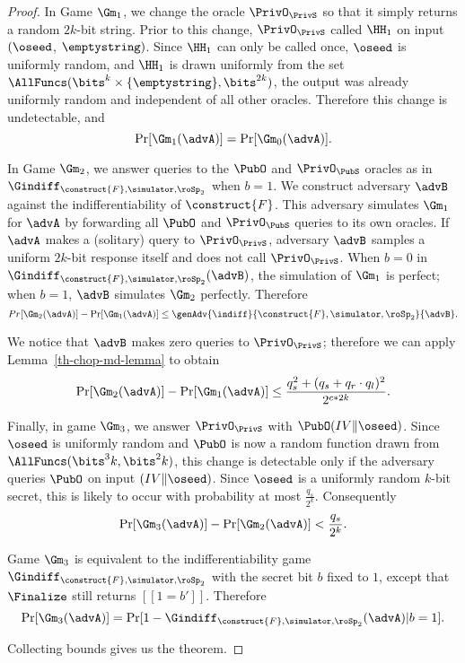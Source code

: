 \begin{proof}
	In Game $\Gm_1$, we change the oracle $\PrivO_{\PrivS}$ so that it simply returns a random $2k$-bit string. Prior to this change, $\PrivO_{\PrivS}$ called $\HH_1$ on input $(\oseed$, $\emptystring)$. Since $\HH_1$ can only be called once, $\oseed$ is uniformly random, and $\HH_1$ is drawn uniformly from the set $\AllFuncs(\bits^k \times \{\emptystring\}, \bits^{2k})$, the output was already uniformly random and independent of all other oracles. Therefore this change is undetectable, and 
	\[\Pr[\Gm_1(\advA)] = \Pr[\Gm_0(\advA)].\] 
	
	In Game $\Gm_2$, we answer queries to the $\PubO$ and $\PrivO_{\PubS}$ oracles as in $\Gindiff_{\construct{F}, \simulator, \roSp_2}$ when $b = 1$. We construct adversary $\advB$ against the indifferentiability of $\construct{F}$. This adversary simulates $\Gm_1$ for $\advA$ by forwarding all $\PubO$ and $\PrivO_{\PubS}$ queries to its own oracles. If $\advA$ makes a (solitary) query to $\PrivO_{\PrivS}$, adversary $\advB$ samples a uniform $2k$-bit response itself and does not call $\PrivO_{\PrivS}$. When $b=0$ in $\Gindiff_{\construct{F}, \simulator, \roSp_2}(\advB)$, the simulation of $\Gm_1$ is perfect; when $b=1$, $\advB$ simulates $\Gm_2$ perfectly. Therefore
	\[Pr[\Gm_2(\advA)]-\Pr[\Gm_1(\advA)]\leq \genAdv{\indiff}{\construct{F},\simulator,\roSp_2}{\advB}.\]
	
	 We notice that $\advB$ makes zero queries to $\PrivO_{\PrivS}$; therefore we can apply Lemma~\ref{th-chop-md-lemma} to obtain 
	 \[\Pr[\Gm_2(\advA)]-\Pr[\Gm_1(\advA)]\leq\frac{q_s^2 + (q_s+q_r \cdot q_l)^2}{2^{c*2k}}.\]
	
	Finally, in game $\Gm_3$, we answer $\PrivO_{\PrivS}$ with $\PubO(IV \| \oseed)$. Since $\oseed$ is uniformly random and $\PubO$ is now a random function drawn from $\AllFuncs(\bits^3k, \bits^2k)$, this change is detectable only if the adversary queries $\PubO$ on input $(IV \| \oseed)$. Since $\oseed$ is a uniformly random $k$-bit secret, this is likely to occur with probability at most $\frac{q_s}{2^k}$. Consequently 
	\[\Pr[\Gm_3(\advA)]-\Pr[\Gm_2(\advA)] < \frac{q_s}{2^k}.\]
	
	Game $\Gm_3$ is equivalent to the indifferentiability game $\Gindiff_{\construct{F}, \simulator, \roSp_2}$ with the secret bit $b$ fixed to $1$, except that $\Finalize$ still returns $[[1 = b']]$. Therefore
	\[\Pr[\Gm_3(\advA)] = \Pr[1-\Gindiff_{\construct{F}, \simulator, \roSp_2}(\advA) | b = 1]. \]
	
	Collecting bounds gives us the theorem.
\end{proof}
